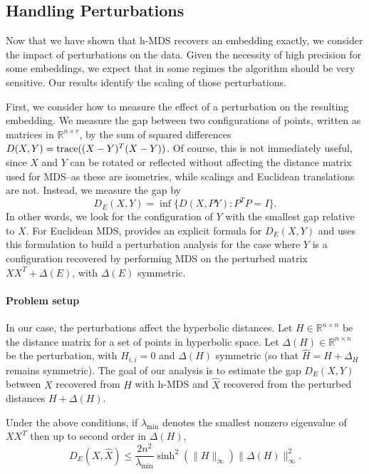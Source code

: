 
\subsection{Handling Perturbations}
Now that we have shown that h-MDS recovers an embedding exactly, we
consider the impact of perturbations on the data. Given the necessity
of high precision for some embeddings, we expect that in some regimes
the algorithm should be very sensitive. Our results identify the
scaling of those perturbations.


First, we consider how to measure the effect of a perturbation on the
resulting embedding.  We measure the gap between two configurations of
points, written as matrices in $\mathbb{R}^{n \times r}$, by the sum
of squared differences $D(X,Y) = \operatorname{trace}((X-Y)^T(X-Y))$. Of course, this
is not immediately useful, since $X$ and $Y$ can be rotated or
reflected without affecting the distance matrix used for MDS--as these
are isometries, while scalings and Euclidean translations are
not. Instead, we measure the gap by
\[D_E(X,Y) = \inf \{D(X,PY) : P^T P = I\}.\]
In other words, we look for the configuration of $Y$ with the smallest
gap relative to $X$. For Euclidean MDS, \citet{Sibson1} provides an
explicit formula for $D_E(X,Y)$ and uses this formulation to build a
perturbation analysis for the case where $Y$ is a configuration
recovered by performing MDS on the perturbed matrix $XX^T+\Delta(E)$,
with $\Delta(E)$ symmetric.

\paragraph{Problem setup} In our case, the perturbations affect the hyperbolic distances. Let $H \in 
\mathbb{R}^{n \times  n}$ be the distance matrix for a set of points in hyperbolic space. Let $\Delta(H) \in \mathbb{R}^{n \times n}$ be the perturbation, with $H_{i,i}= 0$ and $\Delta(H)$ symmetric (so that $\hat H = H + \Delta_{H}$ remains symmetric).
The goal of our analysis is
to estimate the gap $D_E(X,Y)$ between $X$ recovered from $H$ with
h-MDS and $\hat X$ recovered from the perturbed distances
$H+\Delta(H)$.

\begin{lemma}
\label{lemma:hmds-perturb}
Under the above conditions, if $\lambda_{\min}$ denotes the smallest nonzero eigenvalue of $X X^T$ then up to second order in $\Delta(H)$,
\[
  D_E(X,\hat X) \le \frac{2 n^2}{\lambda_{\min}} \sinh^2\left( \| H \|_{\infty} \right) \| \Delta(H) \|_{\infty}^2.
\]
\end{lemma}

